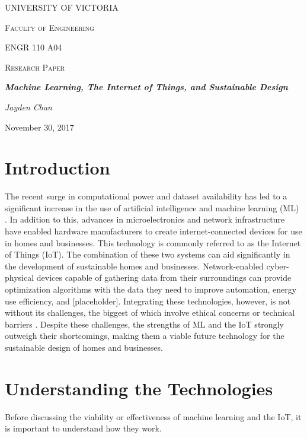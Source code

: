 \documentclass[letterpaper]{article}
\begin{document}
\begin{titlepage}
    \centering
    {\scshape\huge UNIVERSITY OF VICTORIA \par}
    \vspace{1cm}
    {\scshape\LARGE Faculty of Engineering \par\Large ENGR 110 A04\par}
    \vspace{1cm}
    {\scshape\Large Research Paper \par}
    \vspace{1.5cm}
    {\huge\bfseries \emph{Machine Learning, The Internet of Things, and Sustainable Design} \par}
    \vspace{2cm}
    {\Large\itshape Jayden Chan \par}
    \vfill
    {\large November 30, 2017\par}
\end{titlepage}

\pagestyle{customPage}

\section{Introduction}
The recent surge in computational power and dataset availability has led to a significant increase in the use of artificial intelligence and machine learning (ML) \cite{chan17}. In addition to this, advances in microelectronics and network infrastructure have enabled hardware manufacturers to create internet-connected devices for use in homes and businesses. This technology is commonly referred to as the Internet of Things (IoT). The combination of these two systems can aid significantly in the development of sustainable homes and businesses. Network-enabled cyber-physical devices capable of gathering data from their surroundings can provide optimization algorithms with the data they need to improve automation, energy use efficiency, and [placeholder]. Integrating these technologies, however, is not without its challenges, the biggest of which involve ethical concerns or technical barriers \cite{perisic16, mccalman17, vlacheas13}. Despite these challenges, the strengths of ML and the IoT strongly outweigh their shortcomings, making them a viable future technology for the sustainable design of homes and businesses.

\section{Understanding the Technologies}
Before discussing the viability or effectiveness of machine learning and the IoT, it is important to understand how they work.
\end{document}

